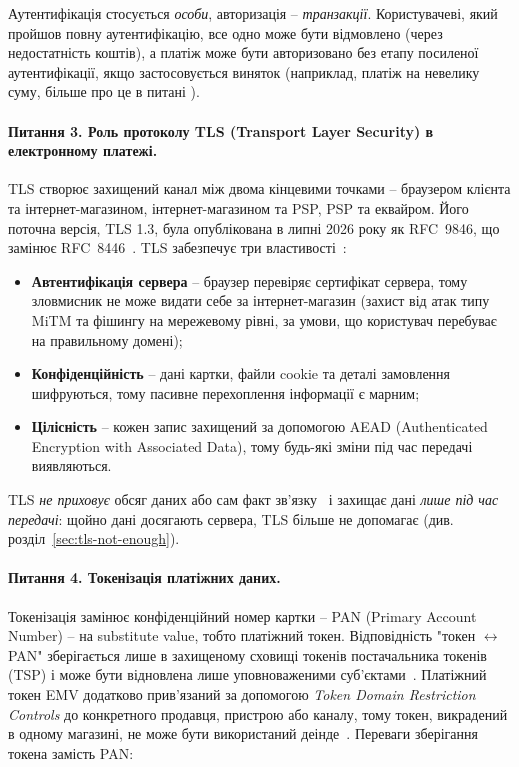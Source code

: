 Аутентифікація стосується \emph{особи}, авторизація -- \emph{транзакції}. Користувачеві, який пройшов повну 
аутентифікацію, все одно може бути відмовлено (через недостатність коштів), а платіж може бути авторизовано 
без етапу посиленої аутентифікації, якщо застосовується виняток (наприклад, платіж на невелику суму, більше про 
це в питані ).

\paragraph{Питання 3. Роль протоколу TLS (Transport Layer Security) в електронному платежі.}
TLS створює захищений канал між двома кінцевими точками -- браузером клієнта та інтернет-магазином, інтернет-магазином 
та PSP, PSP та еквайром. Його поточна версія, TLS 1.3, була опублікована в липні 2026 року як RFC~9846, що 
замінює RFC~8446~\cite{rfc9846}. TLS забезпечує три властивості~\cite{rfc9846}:

\begin{itemize}[noitemsep]
    \item \textbf{Автентифікація сервера} -- браузер перевіряє сертифікат сервера, тому зловмисник не може 
        видати себе за інтернет-магазин (захист від атак типу MiTM та фішингу на мережевому рівні, за умови, 
        що користувач перебуває на правильному домені);
    \item \textbf{Конфіденційність} -- дані картки, файли cookie та деталі замовлення шифруються, тому пасивне 
        перехоплення інформації є марним;
    \item \textbf{Цілісність} -- кожен запис захищений за допомогою AEAD (Authenticated Encryption with Associated 
        Data), тому будь-які зміни під час передачі виявляються.
\end{itemize}
TLS \emph{не приховує} обсяг даних або сам факт зв'язку~\cite{rfc9846} і захищає дані \emph{лише під час передачі}: 
щойно дані досягають сервера, TLS більше не допомагає (див. розділ~\ref{sec:tls-not-enough}).

\paragraph{Питання 4. Токенізація платіжних даних.}
Токенізація замінює конфіденційний номер картки -- PAN (Primary Account Number) -- на substitute value, тобто 
платіжний токен. Відповідність "токен $\leftrightarrow$ PAN"{} зберігається лише в захищеному сховищі токенів 
постачальника токенів (TSP) і може бути відновлена лише уповноваженими суб'єктами~\cite{emv_tokenisation}. 
Платіжний токен EMV додатково прив'язаний за допомогою \emph{Token Domain Restriction Controls} до конкретного продавця, 
пристрою або каналу, тому токен, викрадений в одному магазині, не може бути використаний деінде~\cite{emv_tokenisation_qrg}. 
Переваги зберігання токена замість PAN:

